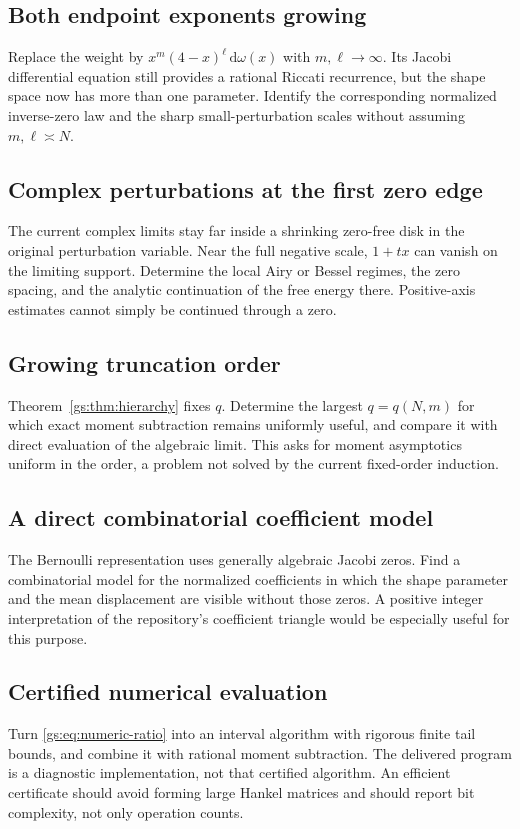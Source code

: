 \documentclass[11pt,a4paper]{article}
\numberwithin{equation}{section}
\theoremstyle{definition}
\theoremstyle{remark}
\newcommand{\dd}{\mathrm d}
\begin{document}
\subsection{Both endpoint exponents growing}\label{gs:x:both}
Replace the weight by $x^m(4-x)^\ell\,\dd\omega(x)$ with $m,\ell\to\infty$.
Its Jacobi differential equation still provides a rational Riccati
recurrence, but the shape space now has more than one parameter.
Identify the corresponding normalized inverse-zero law and the sharp
small-perturbation scales without assuming $m,\ell\asymp N$.

\subsection{Complex perturbations at the first zero edge}\label{gs:x:complex}
The current complex limits stay far inside a shrinking zero-free disk in
the original perturbation variable. Near the full negative scale,
$1+tx$ can vanish on the limiting support. Determine the local Airy or
Bessel regimes, the zero spacing, and the analytic continuation of the
free energy there. Positive-axis estimates cannot simply be continued
through a zero.

\subsection{Growing truncation order}\label{gs:x:order}
Theorem~\ref{gs:thm:hierarchy} fixes $q$. Determine the largest $q=q(N,m)$
for which exact moment subtraction remains uniformly useful, and compare
it with direct evaluation of the algebraic limit. This asks for moment
asymptotics uniform in the order, a problem not solved by the current
fixed-order induction.

\subsection{A direct combinatorial coefficient model}\label{gs:x:combinatorial}
The Bernoulli representation uses generally algebraic Jacobi zeros.
Find a combinatorial model for the normalized coefficients in which the
shape parameter and the mean displacement are visible without those
zeros. A positive integer interpretation of the repository's coefficient
triangle would be especially useful for this purpose.

\subsection{Certified numerical evaluation}\label{gs:x:certified}
Turn \eqref{gs:eq:numeric-ratio} into an interval algorithm with rigorous
finite tail bounds, and combine it with rational moment subtraction.
The delivered program is a diagnostic implementation, not that certified
algorithm. An efficient certificate should avoid forming large Hankel
matrices and should report bit complexity, not only operation counts.
\end{document}
